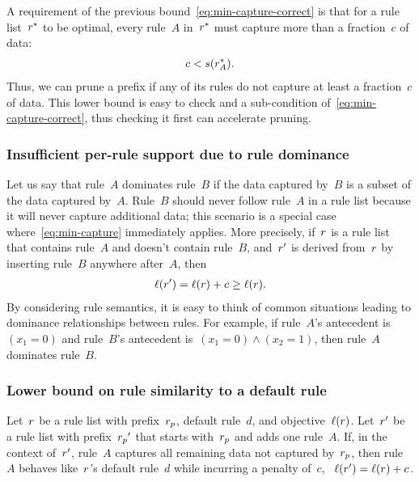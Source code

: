 A requirement of the previous bound~\eqref{eq:min-capture-correct}
is that for a rule list~${r}^*$ to be optimal, every rule~$A$ in~${r}^*$ must
capture more than a fraction~$c$ of data:
\begin{align}
c < s(\RL_A^*).
\label{eq:min-capture}
\end{align}
Thus, we can prune a prefix if any of its rules do not capture at least
a fraction~$c$ of data.
%
This lower bound is easy to check and a sub-condition of~\eqref{eq:min-capture-correct},
thus checking it first can accelerate pruning.

\subsubsection{Insufficient per-rule support due to rule dominance}

Let us say that rule~$A$ dominates rule~$B$ if the data captured by~$B$ is a subset of the data captured by~$A$.
%
Rule~$B$ should never follow rule~$A$ in a rule list because it will never capture additional data;
this scenario is a special case where~\eqref{eq:min-capture} immediately applies.
%
More precisely, if~${r}$ is a rule list that contains rule~$A$ and doesn't contain rule~$B$,
and~${r}'$ is derived from~${r}$ by inserting rule~$B$ anywhere after~$A$, then
\begin{align}
\ell(\RL') = \ell(\RL) + c \ge \ell(\RL).
\end{align}
By considering rule semantics, it is easy to think of common situations
leading to dominance relationships between rules.
%
For example, if rule~$A$'s antecedent is~${(x_1 = 0)}$ and rule~$B$'s
antecedent is~${(x_1 = 0) \wedge (x_2 = 1)}$, then rule~$A$ dominates rule~$B$.
%

\subsubsection{Lower bound on rule similarity to a default rule}

Let~${r}$ be a rule list with prefix~${r_p}$, default rule~$d$, and objective~$\ell({r})$.
%
Let~${r}'$ be a rule list with prefix~${r_p}'$ that starts with~${r_p}$ and adds one rule~$A$.
%
If, in the context of~${r}'$, rule~$A$ captures all remaining data not captured by~${r_p}$,
then rule~$A$ behaves like~${r}$'s default rule~$d$ while incurring a penalty of~$c$,
\ie ~${\ell({r}') = \ell({r}) + c}$.

